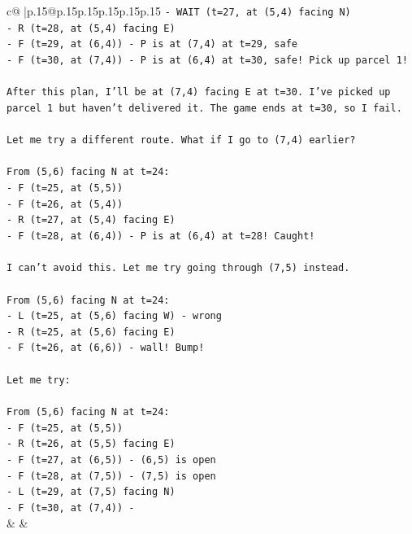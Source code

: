 \documentclass{article}
\begin{document}
{\begin{supertabular}{c@{$\;$}|p{.15\linewidth}@{}p{.15\linewidth}p{.15\linewidth}p{.15\linewidth}p{.15\linewidth}p{.15\linewidth}}
{{{\texttt{{-} WAIT (t=27, at (5,4) facing N)} \\
\texttt{{-} R (t=28, at (5,4) facing E)} \\
\texttt{{-} F (t=29, at (6,4)) {-} P is at (7,4) at t=29, safe} \\
\texttt{{-} F (t=30, at (7,4)) {-} P is at (6,4) at t=30, safe! Pick up parcel 1!} \\
\\ 
\texttt{After this plan, I'll be at (7,4) facing E at t=30. I've picked up parcel 1 but haven't delivered it. The game ends at t=30, so I fail.} \\
\\ 
\texttt{Let me try a different route. What if I go to (7,4) earlier?} \\
\\ 
\texttt{From (5,6) facing N at t=24:} \\
\texttt{{-} F (t=25, at (5,5))} \\
\texttt{{-} F (t=26, at (5,4))} \\
\texttt{{-} R (t=27, at (5,4) facing E)} \\
\texttt{{-} F (t=28, at (6,4)) {-} P is at (6,4) at t=28! Caught!} \\
\\ 
\texttt{I can't avoid this. Let me try going through (7,5) instead.} \\
\\ 
\texttt{From (5,6) facing N at t=24:} \\
\texttt{{-} L (t=25, at (5,6) facing W) {-} wrong} \\
\texttt{{-} R (t=25, at (5,6) facing E)} \\
\texttt{{-} F (t=26, at (6,6)) {-} wall! Bump!} \\
\\ 
\texttt{Let me try:} \\
\\ 
\texttt{From (5,6) facing N at t=24:} \\
\texttt{{-} F (t=25, at (5,5))} \\
\texttt{{-} R (t=26, at (5,5) facing E)} \\
\texttt{{-} F (t=27, at (6,5)) {-} (6,5) is open} \\
\texttt{{-} F (t=28, at (7,5)) {-} (7,5) is open} \\
\texttt{{-} L (t=29, at (7,5) facing N)} \\
\texttt{{-} F (t=30, at (7,4)) {-}} \\
            }
        }
    }
    & & \\ \\


\end{supertabular}}
\end{document}
